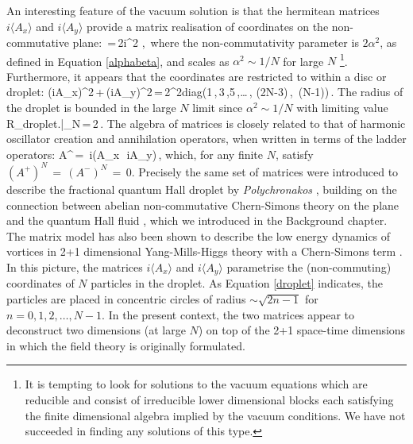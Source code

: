 An interesting feature of the vacuum solution is that the hermitean matrices $i\langle A_x\rangle$ and $i\langle A_y\rangle$ provide a matrix realisation of coordinates on the non-commutative plane:
\be
{}\,=\,2i\alpha^2 ,\,
\ee
where the non-commutativity parameter is $2\alpha^2$, as defined in Equation \eqref{alphabeta}, and scales as $\alpha^2\sim 1/N$ for large $N$
\footnote{ It is tempting to look for solutions to the vacuum equations which are reducible and consist of irreducible lower dimensional blocks each satisfying the finite dimensional algebra  implied by the vacuum conditions.   We have not succeeded in finding any solutions of this type.}. Furthermore, it appears that the coordinates are restricted to within a disc or droplet: 
\be
\left(i\langle A_x\rangle\right)^2\,+\,\left(i\langle A_y\rangle\right)^2\,=\,2\alpha^2{\rm diag}\left(1\,,\,3\,,5\,,\ldots\,, (2N-3)\,,\, (N-1)\right)\,.\label{droplet}
\ee
The radius of the droplet is bounded in the large $N$ limit since $\alpha^2 \sim 1/N$ with limiting value
\be
R_{\rm droplet}\left.\right|_{N\to\infty}\,=\,2\beta{}\,.
\ee
The algebra of matrices is closely related to that of harmonic oscillator creation and annihilation operators, when written in terms of the ladder operators:
\be
A^\pm\,=\, i\left(\langle A_x\rangle \,\pm\, i\langle A_y\rangle\right)\,,
\ee
which, for any finite $N$, satisfy $(A^+)^N\,=\,(A^-)^N\,=\,0$.
Precisely the same set of matrices were introduced to describe the fractional quantum Hall droplet by \textit{Polychronakos} \cite{Polychronakos:2001mi}, building on the connection between abelian non-commutative Chern-Simons theory on the plane and the quantum Hall fluid \cite{Susskind:2001fb}, which we introduced in the Background chapter. The matrix model has also been shown to describe the low energy dynamics of vortices in 2+1 dimensional Yang-Mills-Higgs theory with a Chern-Simons term \cite{Tong:2003vy, Tong:2015xaa}.
In this picture, the matrices $i\langle A_x \rangle$ and $i\langle A_y\rangle $ parametrise the (non-commuting) coordinates of $N$ particles in the droplet. As Equation \eqref{droplet} indicates, the particles are placed in concentric circles of radius $\sim \sqrt{2n-1}$ for $n=0,1,2,\ldots, N-1$. In the present context, the two matrices appear to deconstruct two dimensions (at large $N$) on top of the 2+1 space-time dimensions in which the field theory is originally formulated. 

